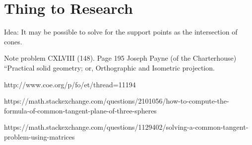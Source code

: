 \documentclass{article}
\begin{document}
\section{Thing to Research}

Idea: It may be possible to solve for the support points as the intersection of cones\cite{shene1994lower}.

Note problem CXLVIII (148). Page 195
Joseph Payne (of the Charterhouse)
``Practical solid geometry; or, Orthographic and Isometric projection.

http://www.coe.org/p/fo/et/thread=11194

https://math.stackexchange.com/questions/2101056/how-to-compute-the-formula-of-common-tangent-plane-of-three-spheres

https://math.stackexchange.com/questions/1129402/solving-a-common-tangent-problem-using-matrices







\end{document}
